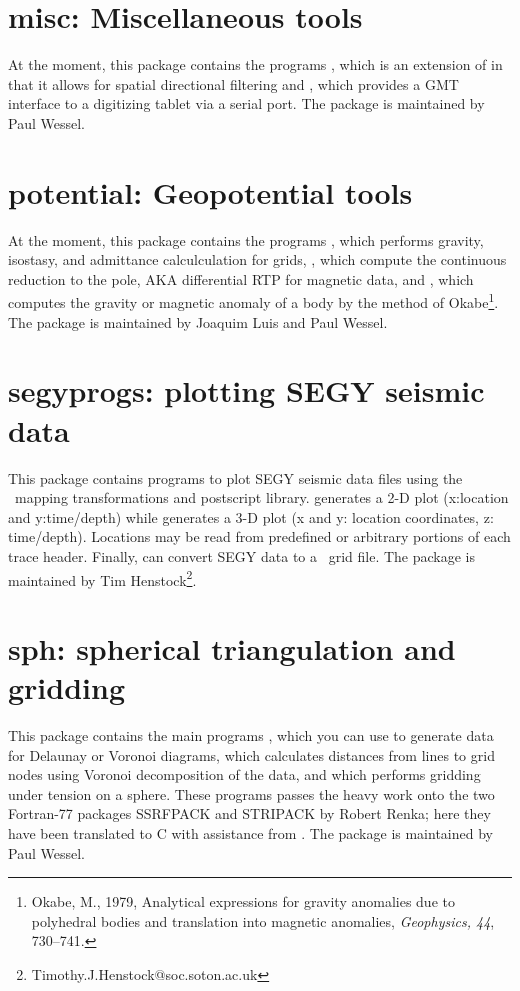 \section{misc: Miscellaneous tools}

At the moment, this package contains the programs , which
is an extension of  in that it allows for spatial directional
filtering and , which provides a GMT interface
to a digitizing tablet via a serial port.
The package is maintained by Paul Wessel.

\section{potential: Geopotential tools}

At the moment, this package contains the programs , which
performs gravity, isostasy, and admittance calculculation for grids, , which
compute the continuous reduction to the pole, AKA differential RTP for magnetic data,
and , which computes the gravity or magnetic anomaly of a body by
the method of Okabe\footnote{Okabe, M., 1979, Analytical expressions for gravity
anomalies due to polyhedral bodies and translation into 
magnetic anomalies, \emph{Geophysics, 44}, 730--741.}.
The package is maintained by Joaquim Luis and Paul Wessel.

\section{segyprogs: plotting SEGY seismic data}

This package contains programs to plot SEGY seismic data files using
the \GMT\ mapping transformations and postscript library.  generates
a 2-D plot (x:location and y:time/depth) while  generates a
3-D plot (x and y: location coordinates, z: time/depth). Locations may be
read from predefined or arbitrary portions of each trace header.  Finally,
 can convert SEGY data to a \GMT\ grid file.
The package is maintained by Tim Henstock\footnote{Timothy.J.Henstock@soc.soton.ac.uk}.

\section{sph: spherical triangulation and gridding}

This package contains the main programs ,
which you can use to generate data for Delaunay or Voronoi diagrams, 
 which calculates distances from lines to grid
nodes using Voronoi decomposition of the data, and
 which performs gridding under tension on
a sphere.  These programs passes the heavy work onto the two Fortran-77
packages SSRFPACK and STRIPACK by Robert Renka; here they have been
translated to C with assistance from .
The package is maintained by Paul Wessel.

